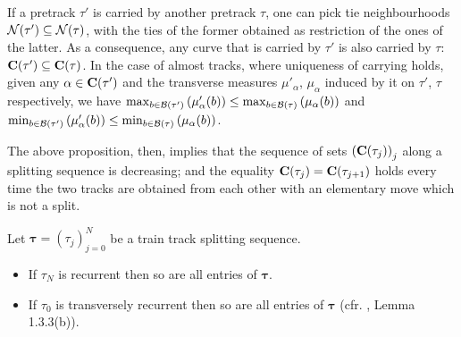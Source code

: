 \begin{rmk}\label{rmk:decreasingmeasures}
If a pretrack $\tau'$ is carried by another pretrack $\tau$, one can pick tie neighbourhoods ${\mathcal N}(\tau')\subseteq {\mathcal N}(\tau)$, with the ties of the former obtained as restriction of the ones of the latter. As a consequence, any curve that is carried by $\tau'$ is also carried by $\tau$: $\mathbf C(\tau')\subseteq \mathbf C(\tau)$. In the case of almost tracks, where uniqueness of carrying holds, given any $\alpha\in\mathbf C(\tau')$ and the transverse measures $\mu'_\alpha$, $\mu_\alpha$ induced by it on $\tau'$, $\tau$ respectively, we have $\max_{b\in\mathcal B(\tau')}\left(\mu'_\alpha(b)\right)\leq \max_{b\in\mathcal B(\tau)}\left(\mu_\alpha(b)\right)$ and $\min_{b\in\mathcal B(\tau')}\left(\mu'_\alpha(b)\right)\leq \min_{b\in\mathcal B(\tau)}\left(\mu_\alpha(b)\right)$.

The above proposition, then, implies that the sequence of sets $\left(\mathbf C(\tau_j)\right)_j$ along a splitting sequence is decreasing; and the equality $\mathbf C(\tau_j)=\mathbf C(\tau_{j+1})$ holds every time the two tracks are obtained from each other with an elementary move which is not a split.
\end{rmk}

\begin{rmk}\label{rmk:recurrence_at_extremes}
Let $\bm\tau=(\tau_j)_{j=0}^N$ be a train track splitting sequence.
\begin{itemize}
\item If $\tau_N$ is recurrent then so are all entries of $\bm\tau$.
\item If $\tau_0$ is transversely recurrent then so are all entries of $\bm\tau$ (cfr. \cite{penner}, Lemma 1.3.3(b)).
\end{itemize}
\end{rmk}


